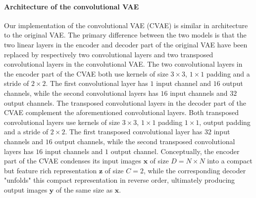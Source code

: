 
\paragraph{Architecture of the convolutional VAE}
Our implementation of the convolutional VAE  (CVAE) is similar in architecture to the original VAE\@. The primary difference between the two models is that the two linear layers in the encoder and decoder part of the original VAE have been replaced by respectively two convolutional layers and two transposed convolutional layers in the convolutional VAE\@. The two convolutional layers in the encoder part of the CVAE both use kernels of size $3\times 3$, $1\times 1$ padding and a stride of $2\times2$. The first convolutional layer has $1$ input channel and $16$ output channels, while the second convolutional layers has $16$ input channels and $32$ output channels. \iffalse As such, each convolutional layer decreases the spatial dimensions of their input by a factor of $2$, and the second convolutional layer additionally increases the feature dimension of its input by a factor $2$ to offset the loss in spatial dimensions. \fi The transposed convolutional layers in the decoder part of the CVAE complement the aforementioned convolutional layers. Both transposed convolutional layers use kernels of size $3\times3$, $1\times 1$ padding $1\times 1$, output padding and a stride of $2\times 2$. The first transposed convolutional layer has $32$ input channels and $16$ output channels, while the second transposed convolutional layers has $16$ input channels and $1$ output channel. \iffalse As such, each transposed convolutional layers "undoes" the spatial reduction produced by a corresponding prior convolutional layer by upsampling the spatial dimensions of its input with a factor of $2$. \fi Conceptually, the encoder part of the CVAE condenses its input images $\mathbf{x}$ of size $D = N \times N$ into a compact but feature rich representation $\mathbf{z}$ of size $C = 2$, while the corresponding decoder "unfolds" this compact representation in reverse order, ultimately producing output images $\mathbf{y}$ of the same size as $\mathbf{x}$. 

